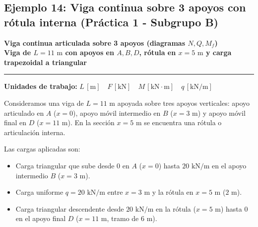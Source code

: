 \subsection{Ejemplo 14: Viga continua sobre 3 apoyos con rótula interna (Práctica 1 - Subgrupo B)}



\begin{tcolorbox}[colback=blue!3!white, colframe=blue!40!black, arc=3pt, boxrule=0.8pt, left=8pt, right=8pt, top=6pt, bottom=6pt]

    \centering

    {\Large\bfseries\color{blue!60!black} Viga continua articulada sobre 3 apoyos (diagramas $N, Q, M_f$)}\\[2pt]

    {\normalsize\bfseries Viga de $L = 11\text{ m}$ con apoyos en $A, B, D$, rótula en $x=5\text{ m}$ y carga trapezoidal a triangular}



    \vspace{4pt}\hrule\vspace{4pt}

    {\small\textbf{Unidades de trabajo:} $L\,[\text{m}] \quad F\,[\text{kN}] \quad M\,[\text{kN}\cdot\text{m}] \quad q\,[\text{kN/m}]$}

\end{tcolorbox}






Consideramos una viga de $L = 11\text{ m}$ apoyada sobre tres apoyos verticales: apoyo articulado en $A$ ($x=0$), apoyo móvil intermedio en $B$ ($x=3\text{ m}$) y apoyo móvil final en $D$ ($x=11\text{ m}$). En la sección $x = 5\text{ m}$ se encuentra una rótula o articulación interna.

Las cargas aplicadas son:

\begin{itemize}

    \item Carga triangular que sube desde $0$ en $A$ ($x=0$) hasta $20\text{ kN/m}$ en el apoyo intermedio $B$ ($x=3\text{ m}$).

    \item Carga uniforme $q = 20\text{ kN/m}$ entre $x=3\text{ m}$ y la rótula en $x=5\text{ m}$ ($2\text{ m}$).

    \item Carga triangular descendente desde $20\text{ kN/m}$ en la rótula ($x=5\text{ m}$) hasta $0$ en el apoyo final $D$ ($x=11\text{ m}$, tramo de $6\text{ m}$).

\end{itemize}



